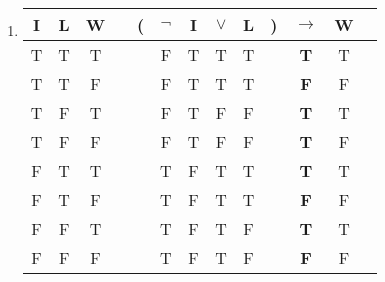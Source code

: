 \begin{enumerate}
\item
\begin{tabular}{@{ }c@{ }@{ }c@{ }@{ }c | c@{ }@{}c@{}@{ }c@{ }@{ }c@{ }@{ }c@{ }@{ }c@{ }@{}c@{}@{ }c@{ }@{ }c@{ }@{ }c}
I & L & W &  & ( & $\lnot$ & I & $\lor$ & L & ) & $\rightarrow$ & W & \\
\hline
T & T & T &  &  & F & T & T & T &  & \textbf{T} & T & \\
T & T & F &  &  & F & T & T & T &  & \textbf{F} & F & \\
T & F & T &  &  & F & T & F & F &  & \textbf{T} & T & \\
T & F & F &  &  & F & T & F & F &  & \textbf{T} & F & \\
F & T & T &  &  & T & F & T & T &  & \textbf{T} & T & \\
F & T & F &  &  & T & F & T & T &  & \textbf{F} & F & \\
F & F & T &  &  & T & F & T & F &  & \textbf{T} & T & \\
F & F & F &  &  & T & F & T & F &  & \textbf{F} & F & \\
\end{tabular}


\end{enumerate}
